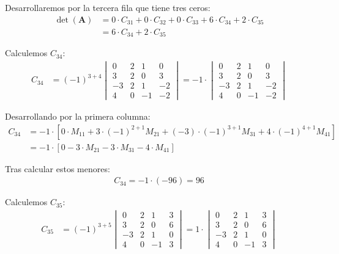 \documentclass{report} %
\begin{document}
Desarrollaremos por la tercera fila que tiene tres ceros:
\begin{align*}
\det(\mathbf{A}) &= 0 \cdot C_{31} + 0 \cdot C_{32} + 0 \cdot C_{33} + 6 \cdot C_{34} + 2 \cdot C_{35} \\
&= 6 \cdot C_{34} + 2 \cdot C_{35}
\end{align*}

Calculemos $C_{34}$:
\begin{align*}
C_{34} &= (-1)^{3+4} \begin{vmatrix}
0 & 2 & 1 & 0 \\
3 & 2 & 0 & 3 \\
-3 & 2 & 1 & -2 \\
4 & 0 & -1 & -2
\end{vmatrix} = -1 \cdot \begin{vmatrix}
0 & 2 & 1 & 0 \\
3 & 2 & 0 & 3 \\
-3 & 2 & 1 & -2 \\
4 & 0 & -1 & -2
\end{vmatrix}
\end{align*}

Desarrollando por la primera columna:
\begin{align*}
C_{34} &= -1 \cdot \left[0 \cdot M_{11} + 3 \cdot (-1)^{2+1} M_{21} + (-3) \cdot (-1)^{3+1} M_{31} + 4 \cdot (-1)^{4+1} M_{41}\right] \\
&= -1 \cdot \left[0 - 3 \cdot M_{21} - 3 \cdot M_{31} - 4 \cdot M_{41}\right]
\end{align*}

Tras calcular estos menores:
\begin{align*}
C_{34} = -1 \cdot (-96) = 96
\end{align*}

Calculemos $C_{35}$:
\begin{align*}
C_{35} &= (-1)^{3+5} \begin{vmatrix}
0 & 2 & 1 & 3 \\
3 & 2 & 0 & 6 \\
-3 & 2 & 1 & 0 \\
4 & 0 & -1 & 3
\end{vmatrix} = 1 \cdot \begin{vmatrix}
0 & 2 & 1 & 3 \\
3 & 2 & 0 & 6 \\
-3 & 2 & 1 & 0 \\
4 & 0 & -1 & 3
\end{vmatrix}
\end{align*}
\end{document}
